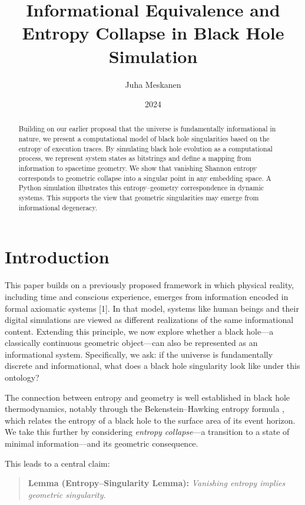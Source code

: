 \documentclass[11pt]{article}
\title{Informational Equivalence and Entropy Collapse in Black Hole Simulation}
\author{Juha Meskanen}
\date{2024}
\begin{document}
\maketitle

\begin{abstract}
  Building on our earlier proposal that the universe is fundamentally informational in nature, we present a computational model of black hole singularities based on the entropy of execution traces. By simulating black hole evolution as a computational process, we represent system states as bitstrings and define a mapping from information to spacetime geometry. We show that vanishing Shannon entropy corresponds to geometric collapse into a singular point in any embedding space. A Python simulation illustrates this entropy–geometry correspondence in dynamic systems. This supports the view that geometric singularities may emerge from informational degeneracy.
\end{abstract}

\section{Introduction}

This paper builds on a previously proposed framework in which physical reality, including time and conscious experience, emerges from information encoded in formal axiomatic systems [1]. In that model, systems like human beings and their digital simulations are viewed as different realizations of the same informational content. Extending this principle, we now explore whether a black hole—a classically continuous geometric object—can also be represented as an informational system. Specifically, we ask: if the universe is fundamentally discrete and informational, what does a black hole singularity look like under this ontology?

The connection between entropy and geometry is well established in black hole thermodynamics, notably through the Bekenstein--Hawking entropy formula \cite{Bekenstein1973,Hawking1975}, which relates the entropy of a black hole to the surface area of its event horizon. We take this further by considering \emph{entropy collapse}---a transition to a state of minimal information---and its geometric consequence.


This leads to a central claim:

\begin{quote}
  \textbf{Lemma (Entropy--Singularity Lemma):} \emph{Vanishing entropy implies geometric singularity.}
\end{quote}
\end{document}
